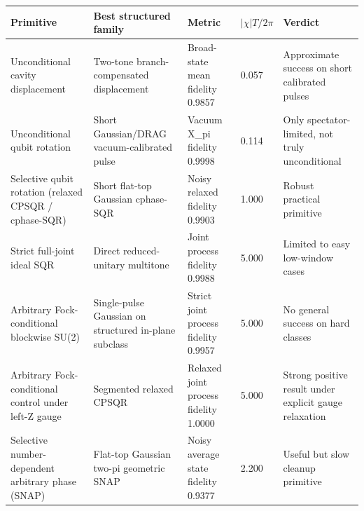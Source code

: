 \begin{tabular}{p{2.5cm}p{2.8cm}p{1.6cm}p{1.35cm}p{2.7cm}}
\toprule
Primitive & Best structured family & Metric & $|\chi|T/2\pi$ & Verdict \\
\midrule
Unconditional cavity displacement & Two-tone branch-compensated displacement & Broad-state mean fidelity 0.9857 & 0.057 & Approximate success on short calibrated pulses \\
Unconditional qubit rotation & Short Gaussian/DRAG vacuum-calibrated pulse & Vacuum X\_pi fidelity 0.9998 & 0.114 & Only spectator-limited, not truly unconditional \\
Selective qubit rotation (relaxed CPSQR / cphase-SQR) & Short flat-top Gaussian cphase-SQR & Noisy relaxed fidelity 0.9903 & 1.000 & Robust practical primitive \\
Strict full-joint ideal SQR & Direct reduced-unitary multitone & Joint process fidelity 0.9988 & 5.000 & Limited to easy low-window cases \\
Arbitrary Fock-conditional blockwise SU(2) & Single-pulse Gaussian on structured in-plane subclass & Strict joint process fidelity 0.9957 & 5.000 & No general success on hard classes \\
Arbitrary Fock-conditional control under left-Z gauge & Segmented relaxed CPSQR & Relaxed joint process fidelity 1.0000 & 5.000 & Strong positive result under explicit gauge relaxation \\
Selective number-dependent arbitrary phase (SNAP) & Flat-top Gaussian two-pi geometric SNAP & Noisy average state fidelity 0.9377 & 2.200 & Useful but slow cleanup primitive \\
\bottomrule
\end{tabular}